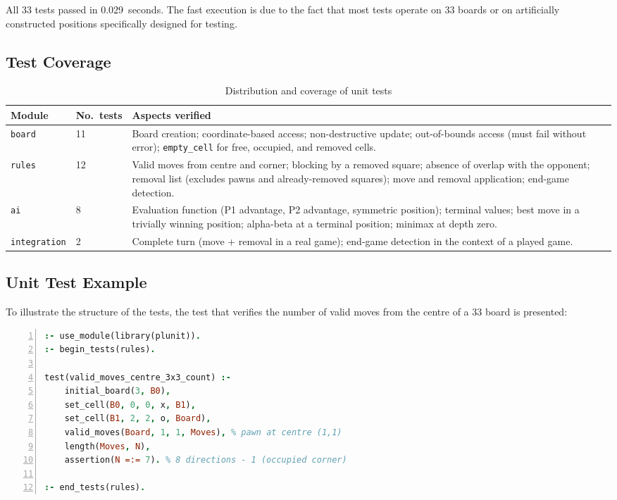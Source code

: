 All 33 tests passed in 0.029~seconds. The fast execution is due
to the fact that most tests operate on 3{\texttimes}3 boards or
on artificially constructed positions specifically designed for testing.

\subsection{Test Coverage}

\begin{table}[htbp]
  \caption{Distribution and coverage of unit tests}
  \label{tab:tests}
  \centering
  \begin{tabular}{llp{7cm}}
    \toprule
    \textbf{Module} & \textbf{No.\ tests} & \textbf{Aspects verified} \\
    \midrule
    \texttt{board}       & 11 &
      Board creation; coordinate-based access;
      non-destructive update; out-of-bounds access
      (must fail without error); \texttt{empty\_cell} for
      free, occupied, and removed cells. \\
    \addlinespace
    \texttt{rules}       & 12 &
      Valid moves from centre and corner;
      blocking by a removed square; absence of overlap
      with the opponent; removal list (excludes pawns
      and already-removed squares); move and removal
      application; end-game detection. \\
    \addlinespace
    \texttt{ai}          & 8 &
      Evaluation function (P1 advantage, P2 advantage,
      symmetric position); terminal values; best
      move in a trivially winning position;
      alpha-beta at a terminal position; minimax at depth zero. \\
    \addlinespace
    \texttt{integration} & 2 &
      Complete turn (move + removal in a real game);
      end-game detection in the context of a played game. \\
    \bottomrule
  \end{tabular}
\end{table}

\subsection{Unit Test Example}

To illustrate the structure of the tests, the test that verifies
the number of valid moves from the centre of a 3{\texttimes}3 board is presented:

\begin{lstlisting}[language=Prolog,
    caption={Test: moves from the centre of a 3{\texttimes}3 board},
    label={lst:test_example},
    numbers=left,
    basicstyle=\small\ttfamily,
    frame=single]
:- use_module(library(plunit)).
:- begin_tests(rules).

test(valid_moves_centre_3x3_count) :-
    initial_board(3, B0),
    set_cell(B0, 0, 0, x, B1),
    set_cell(B1, 2, 2, o, Board),
    valid_moves(Board, 1, 1, Moves), % pawn at centre (1,1)
    length(Moves, N),
    assertion(N =:= 7). % 8 directions - 1 (occupied corner)

:- end_tests(rules).
\end{lstlisting}

